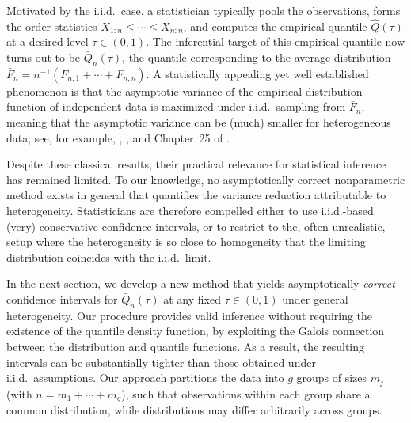 \documentclass[12pt]{article}
\theoremstyle{remark}
\begin{document}
Motivated by the i.i.d.\ case, a statistician typically pools the observations, forms the order statistics $X_{1:n} \le \cdots \le X_{n:n}$, and computes the empirical quantile $\widehat{Q}(\tau)$ at a desired level $\tau \in (0,1)$.  The inferential target of  this empirical quantile  now turns out to be $\bar{Q}_n(\tau)$, the quantile corresponding to %
the average distribution 
$\bar{F}_n = n^{-1} (F_{n,1}+\cdots+F_{n,n})$.  %
A statistically appealing yet well established phenomenon is that the asymptotic variance of the empirical distribution function of  independent data is maximized under i.i.d.\ sampling from $\bar{F}_n$, meaning that the asymptotic variance can be (much) smaller  for heterogeneous data; 
see, for example, \cite{S1973}, \cite{Z1976}, and Chapter~25 of \cite{SW1986}.

Despite these classical results, their practical relevance for statistical inference has remained limited. 
To our knowledge, no asymptotically correct nonparametric method exists in general that quantifies the variance reduction attributable to heterogeneity. Statisticians are therefore compelled either to use i.i.d.-based (very) conservative confidence intervals, or to restrict to the, often unrealistic,  setup  where the heterogeneity is so close to homogeneity  that the limiting distribution coincides with the i.i.d.\ limit. %

In the next section, we develop a new method that yields asymptotically \textit{correct} confidence intervals for $\bar{Q}_n(\tau)$ at any fixed $\tau \in (0,1)$ under general heterogeneity. Our procedure provides valid inference without requiring the existence of the quantile density function, by exploiting the Galois connection between the distribution and quantile functions. As a result, the resulting intervals can be substantially tighter than those obtained under i.i.d.\ assumptions. Our approach partitions the data into $g$ groups of sizes $m_j$ (with $n = m_1 + \cdots + m_g$), such that observations within each group share a common distribution, while distributions may differ arbitrarily across groups.
\end{document}
